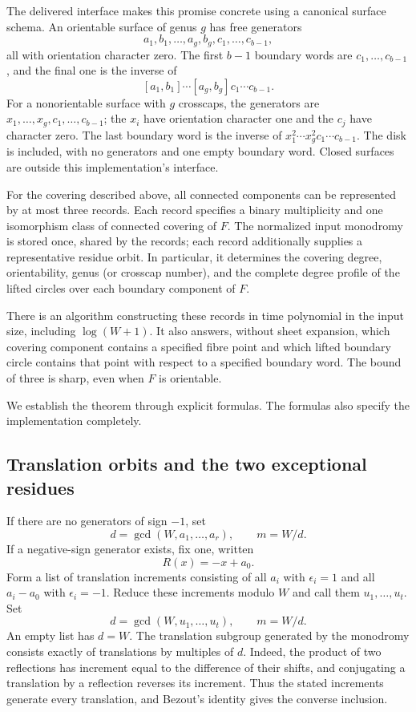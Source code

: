 The delivered interface makes this promise concrete using a canonical
surface schema.  An orientable surface of genus $g$ has free generators
\[
 a_1,b_1,\ldots,a_g,b_g,c_1,\ldots,c_{b-1},
\]
all with orientation character zero.  The first $b-1$ boundary words are
$c_1,\ldots,c_{b-1}$, and the final one is the inverse of
\[
 [a_1,b_1]\cdots[a_g,b_g]c_1\cdots c_{b-1}.
\]
For a nonorientable surface with $g$ crosscaps, the generators are
$x_1,\ldots,x_g,c_1,\ldots,c_{b-1}$; the $x_i$ have orientation
character one and the $c_j$ have character zero.  The last boundary word
is the inverse of $x_1^2\cdots x_g^2c_1\cdots c_{b-1}$.
The disk is included, with no generators and one empty boundary word.
Closed surfaces are outside this implementation's interface.

\begin{theorem}
\label{thm:dihedral-three}
For the covering described above, all connected components can be
represented by at most three records.  Each record specifies a binary
multiplicity and one isomorphism class of connected covering of $F$.
The normalized input monodromy is stored once, shared by the records;
each record additionally supplies a representative residue orbit.
In particular, it determines the covering degree, orientability, genus
(or crosscap number), and the complete degree profile of the lifted
circles over each boundary component of $F$.

There is an algorithm constructing these records in time polynomial in
the input size, including $\log(W+1)$.  It also answers, without sheet
expansion, which covering component contains a specified fibre point
and which lifted boundary circle contains that point with respect to a
specified boundary word.  The bound of three is sharp, even when $F$ is
orientable.
\end{theorem}

We establish the theorem through explicit formulas.  The formulas also
specify the implementation completely.

\subsection{Translation orbits and the two exceptional residues}

If there are no generators of sign $-1$, set
\[
 d=\gcd(W,a_1,\ldots,a_r),\qquad m=W/d.
\]
If a negative-sign generator exists, fix one, written
\[
 R(x)=-x+a_0.
\]
Form a list of translation increments consisting of all $a_i$ with
$\epsilon_i=1$ and all $a_i-a_0$ with $\epsilon_i=-1$.  Reduce these
increments modulo $W$ and call them $u_1,\ldots,u_t$.  Set
\begin{equation}
 d=\gcd(W,u_1,\ldots,u_t),\qquad m=W/d.
 \label{eq:dihedral-gcd}
\end{equation}
An empty list has $d=W$.  The translation subgroup generated by the
monodromy consists exactly of translations by multiples of $d$.
Indeed, the product of two reflections has increment equal to the
difference of their shifts, and conjugating a translation by a
reflection reverses its increment.  Thus the stated increments generate
every translation, and Bezout's identity gives the converse inclusion.

